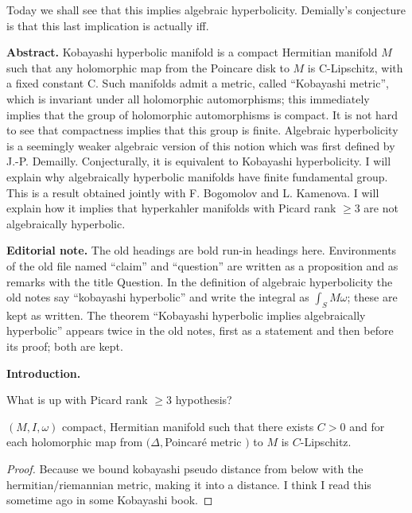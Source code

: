 Today we shall see that this implies
algebraic hyperbolicity. Demially's
conjecture is that this last implication is
actually iff.

\medskip\noindent
{\bf Abstract.}
Kobayashi hyperbolic manifold is a compact
Hermitian manifold $M$ such that any
holomorphic map from the Poincare disk to $M$
is C-Lipschitz, with a fixed constant C. Such
manifolds admit a metric, called ``Kobayashi
metric'', which is invariant under all
holomorphic automorphisms; this immediately
implies that the group of holomorphic
automorphisms is compact. It is not hard to
see that compactness implies that this group
is finite. Algebraic hyperbolicity is a
seemingly weaker algebraic version of this
notion which was first defined by J.-P.
Demailly. Conjecturally, it is equivalent to
Kobayashi hyperbolicity. I will explain why
algebraically hyperbolic manifolds have
finite fundamental group. This is a result
obtained jointly with F. Bogomolov and L.
Kamenova. I will explain how it implies that
hyperkahler manifolds with Picard rank $\geq
3$ are not algebraically hyperbolic.

\medskip\noindent
{\bf Editorial note.}
The old headings are bold run-in headings
here. Environments of the old file named
``claim'' and ``question'' are written as a
proposition and as remarks with the title
Question. In the definition of algebraic
hyperbolicity the old notes say ``kobayashi
hyperbolic'' and write the integral as
$\int_{S}M\omega$; these are kept as written.
The theorem ``Kobayashi hyperbolic implies
algebraically hyperbolic'' appears twice in
the old notes, first as a statement and then
before its proof; both are kept.

\medskip\noindent
{\bf Introduction.}

\begin{remark}[Question]
\label{remark-ah-question-picard}
What is up with Picard rank $\geq 3$
hypothesis?
\end{remark}

\begin{proposition}
\label{proposition-ah-koba-characterization}
$(M,I,\omega)$ compact, Hermitian manifold
such that there exists $C>0$ and for each
holomorphic map from $(\Delta,$Poincaré
metric $)$ to $M$ is $C$-Lipschitz.
\end{proposition}

\begin{proof}
Because we bound kobayashi pseudo distance
from below with the hermitian/riemannian
metric, making it into a distance. I think I
read this sometime ago in some Kobayashi
book.
\end{proof}

